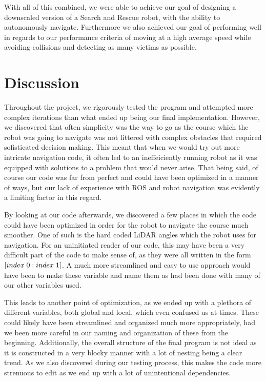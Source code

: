 \documentclass[conference]{IEEEtran}
\begin{document}
With all of this combined, we were able to achieve our goal of designing a downscaled version of a Search and Rescue robot, with the ability to autonomously navigate.
Furthermore we also achieved our goal of performing well in regards to our performance criteria of moving at a high average speed while avoiding collisions and detecting as many victims as possible.

\section{Discussion}
Throughout the project, we rigorously tested the program and attempted more complex iterations than what ended up being our final implementation.
However, we discovered that often simplicity was the way to go as the course which the robot was going to navigate was not littered with complex obstacles that required sofisticated decision making.
This meant that when we would try out more intricate navigation code, it often led to an ineffeiciently running robot as it was equipped with solutions to a problem that would never arise.
That being said, of course our code was far from perfect and could have been optimized in a manner of ways, but our lack of experience with ROS and robot navigation was evidently a limiting factor in this regard.

By looking at our code afterwards, we discovered a few places in which the code could have been optimized in order for the robot to navigate the course much smoother.
One of such is the hard coded LiDAR angles which the robot uses for navigation. For an uninitiated reader of our code, this may have been a very difficult part of the code to make sense of, as they were all written in the form $[index \hspace{1mm} 0: index \hspace{1mm} 1]$.
A much more streamlined and easy to use approach would have been to make these variable and name them as had been done with many of our other variables used.

This leads to another point of optimization, as we ended up with a plethora of different variables, both global and local, which even confused us at times. These could likely have been streamlined and organized much more appropriately, had we been more careful in our naming and organization of these from the beginning.
Additionally, the overall structure of the final program is not ideal as it is constructed in a very blocky manner with a lot of nesting being a clear trend. As we also discovered during our testing process, this makes the code more strenuous to edit as we end up with a lot of unintentional dependencies.
\end{document}
